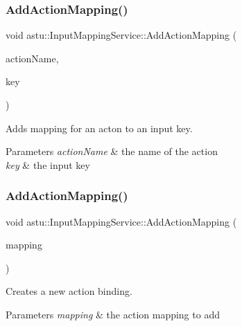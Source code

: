 \subsubsection{\texorpdfstring{Add\+Action\+Mapping()}{AddActionMapping()}\hspace{0.1cm}{\footnotesize\ttfamily [1/2]}}
{\footnotesize\ttfamily void astu\+::\+Input\+Mapping\+Service\+::\+Add\+Action\+Mapping (\begin{DoxyParamCaption}\item[{const std\+::string \&}]{action\+Name,  }\item[{const \hyperlink{classastu_1_1Key}{Key} \&}]{key }\end{DoxyParamCaption})\hspace{0.3cm}{\ttfamily [inline]}}

Adds mapping for an acton to an input key.


\begin{DoxyParams}{Parameters}
{\em action\+Name} & the name of the action \\
\hline
{\em key} & the input key \\
\hline
\end{DoxyParams}
\mbox{\label{classastu_1_1InputMappingService_a0cb02984dc3f9f675375bde109f06537}} 
\subsubsection{\texorpdfstring{Add\+Action\+Mapping()}{AddActionMapping()}\hspace{0.1cm}{\footnotesize\ttfamily [2/2]}}
{\footnotesize\ttfamily void astu\+::\+Input\+Mapping\+Service\+::\+Add\+Action\+Mapping (\begin{DoxyParamCaption}\item[{const \hyperlink{classastu_1_1ActionMapping}{Action\+Mapping} \&}]{mapping }\end{DoxyParamCaption})}

Creates a new action binding.


\begin{DoxyParams}{Parameters}
{\em mapping} & the action mapping to add \\
\hline
\end{DoxyParams}
\mbox{\label{classastu_1_1InputMappingService_a7ef299540b06586bcd12a06a5bd99abc}} 
